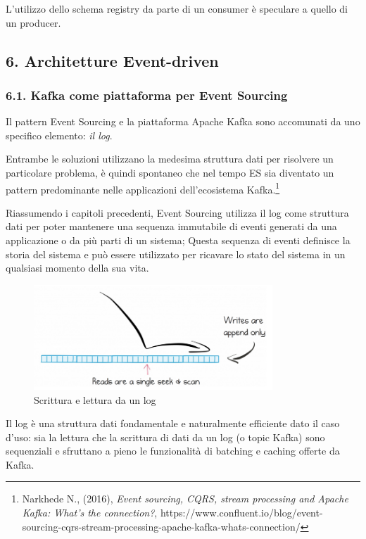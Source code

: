 \documentclass[]{article}
\begin{document}
L'utilizzo dello schema registry da parte di un consumer è speculare a
quello di un producer.

\newpage

\subsection{6. Architetture
Event-driven}\label{architetture-event-driven}

\subsubsection{6.1. Kafka come piattaforma per Event
Sourcing}\label{kafka-come-piattaforma-per-event-sourcing}

Il pattern Event Sourcing e la piattaforma Apache Kafka sono accomunati
da uno specifico elemento: \emph{il log}.

Entrambe le soluzioni utilizzano la medesima struttura dati per
risolvere un particolare problema, è quindi spontaneo che nel tempo ES
sia diventato un pattern predominante nelle applicazioni dell'ecosistema
Kafka.\footnote{Narkhede N., (2016), \emph{Event sourcing, CQRS, stream
  processing and Apache Kafka: What's the connection?},
  https://www.confluent.io/blog/event-sourcing-cqrs-stream-processing-apache-kafka-whats-connection/}

Riassumendo i capitoli precedenti, Event Sourcing utilizza il log come
struttura dati per poter mantenere una sequenza immutabile di eventi
generati da una applicazione o da più parti di un sistema; Questa
sequenza di eventi definisce la storia del sistema e può essere
utilizzato per ricavare lo stato del sistema in un qualsiasi momento
della sua vita.

\begin{figure}
\centering
\includegraphics[width=0.80000\textwidth]{../images/log-kafka.png}
\caption{Scrittura e lettura da un log \label{figure_5}}
\end{figure}

Il log è una struttura dati fondamentale e naturalmente efficiente dato
il caso d'uso: sia la lettura che la scrittura di dati da un log (o
topic Kafka) sono sequenziali e sfruttano a pieno le funzionalità di
batching e caching offerte da Kafka.
\end{document}
